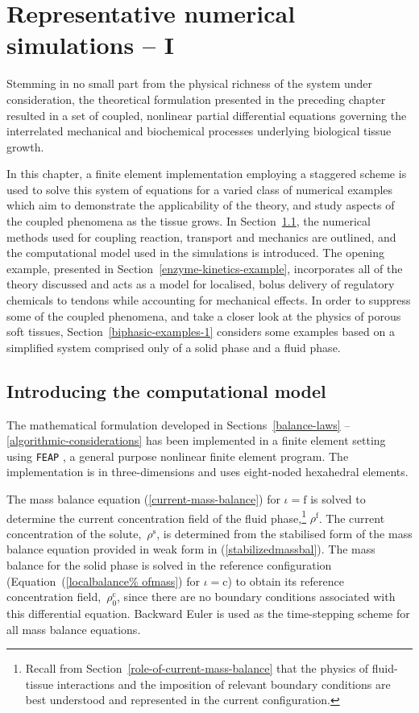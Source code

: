 \chapter{Representative numerical simulations -- I}
\label{numerical-simulations-1}

Stemming in no small part from the physical richness of the system
under consideration, the theoretical formulation presented in the
preceding chapter resulted in a set of coupled, nonlinear partial
differential equations governing the interrelated mechanical and
biochemical processes underlying biological tissue growth.

In this chapter, a finite element implementation employing a staggered
scheme is used to solve this system of equations for a varied class of
numerical examples which aim to demonstrate the applicability of the
theory, and study aspects of the coupled phenomena as the tissue
grows. In Section~\ref{computational-model}, the numerical methods
used for coupling reaction, transport and mechanics are outlined, and
the computational model used in the simulations is introduced. The
opening example, presented in Section~\ref{enzyme-kinetics-example},
incorporates all of the theory discussed and acts as a model for
localised, bolus delivery of regulatory chemicals to tendons while
accounting for mechanical effects. In order to suppress some of the
coupled phenomena, and take a closer look at the physics of porous
soft tissues, Section~\ref{biphasic-examples-1} considers some
examples based on a simplified system comprised only of a solid phase
and a fluid phase.

\section{Introducing the computational model}
\label{computational-model}

The mathematical formulation developed in Sections~\ref{balance-laws}%
--\ref{algorithmic-considerations} has been implemented in a finite
element setting using {\tt FEAP} \citep{FEAPmanual}, a general purpose
nonlinear finite element program. The implementation is in
three-dimensions and uses eight-noded hexahedral elements.

The mass balance equation (\ref{current-mass-balance}) for
\mbox{$\iota = \mathrm{f}$} is solved to determine the current
concentration field of the fluid phase,\footnote{Recall from
  Section~\ref{role-of-current-mass-balance} that the physics of
  fluid-tissue interactions and the imposition of relevant boundary
  conditions are best understood and represented in the current
  configuration.} $\rho^{\mathrm{f}}$. The current concentration of
the solute,~$\rho^{\mathrm{s}}$, is determined from the stabilised
form of the mass balance equation provided in weak form in
(\ref{stabilizedmassbal}). The mass balance for the solid phase is
solved in the reference configuration (Equation~(\ref{localbalance%
  ofmass}) for \mbox{$\iota = \mathrm{c}$}) to obtain its reference
concentration field,~$\rho_{0}^{\mathrm{c}}$, since there are no
boundary conditions associated with this differential equation.
Backward Euler is used as the time-stepping scheme for all mass
balance equations.

